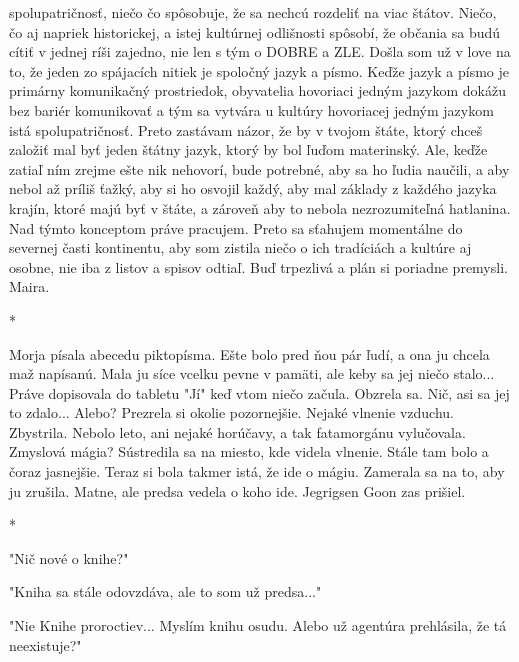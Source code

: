 \documentclass{book}
\begin{document}
spolupatričnosť, niečo čo spôsobuje, že sa nechcú rozdeliť na viac štátov. Niečo, čo aj napriek historickej, a istej kultúrnej odlišnosti spôsobí, že občania sa budú cítiť v jednej ríši zajedno, nie len s tým o DOBRE a ZLE. Došla som už v love na to, že jeden zo spájacích nitiek je spoločný jazyk a písmo. Keďže jazyk a písmo je primárny komunikačný prostriedok, obyvatelia hovoriaci jedným jazykom dokážu bez bariér komunikovať a tým sa vytvára u kultúry hovoriacej jedným jazykom istá spolupatričnosť. Preto zastávam názor, že by v tvojom štáte, ktorý chceš založiť mal byť jeden štátny jazyk, ktorý by bol ľuďom materinský. Ale, keďže zatiaľ ním zrejme ešte nik nehovorí, bude potrebné, aby sa ho ľudia naučili, a aby nebol až príliš ťažký, aby si ho osvojil každý, aby mal základy z každého jazyka krajín, ktoré majú byť v štáte, a zároveň aby to nebola nezrozumiteľná hatlanina. Nad týmto konceptom práve pracujem. Preto sa sťahujem momentálne do severnej časti kontinentu, aby som zistila niečo o ich tradíciách a kultúre aj osobne, nie iba z listov a spisov odtiaľ. Buď trpezlivá a plán si poriadne premysli. Maira.

\begin{center}

*

\end{center}

Morja písala abecedu piktopísma. Ešte bolo pred ňou pár ľudí, a ona ju chcela maž napísanú. Mala ju síce vcelku pevne v pamäti, ale keby sa jej niečo stalo... Práve dopisovala do tabletu "$ $Jí"$ $  keď vtom niečo začula. Obzrela sa. Nič, asi sa jej to zdalo... Alebo? Prezrela si okolie pozornejšie. Nejaké vlnenie vzduchu. Zbystrila. Nebolo leto, ani nejaké horúčavy, a tak fatamorgánu vylučovala. Zmyslová mágia? Sústredila sa na miesto, kde videla vlnenie. Stále tam bolo a čoraz jasnejšie. Teraz si bola takmer istá, že ide o mágiu. Zamerala sa na to, aby ju zrušila. Matne, ale predsa vedela o koho ide. Jegrigsen Goon zas prišiel.

\begin{center}

*

\end{center}

"$ $Nič nové o knihe?"$ $ 

"$ $Kniha sa stále odovzdáva, ale to som už predsa..."$ $ 

"$ $Nie Knihe proroctiev... Myslím knihu osudu. Alebo už agentúra prehlásila, že tá neexistuje?"$ $ 
\end{document}
